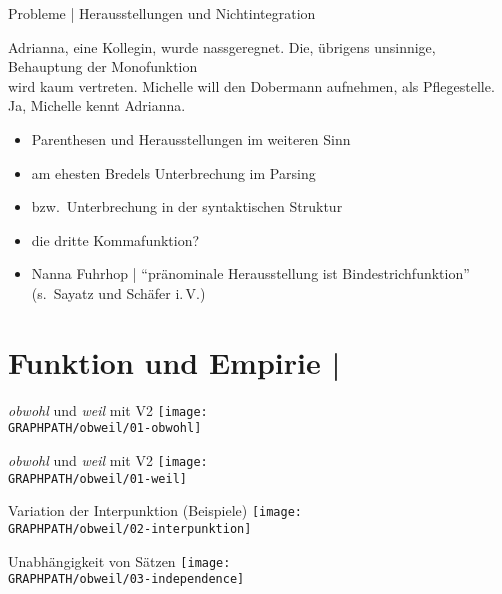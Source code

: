\begin{frame}
  {Probleme | Herausstellungen und Nichtintegration}
  \onslide<+->
  \onslide<+->
  \begin{exe}
    \ex Adrianna, \alert{eine Kollegin}, wurde nassgeregnet.
    \ex Die, \alert{übrigens unsinnige}, Behauptung der Monofunktion\\
    wird kaum vertreten.
    \ex Michelle will den Dobermann aufnehmen, \alert{als Pflegestelle}.
    \ex \alert{Ja}, Michelle kennt Adrianna.
  \end{exe}
  \onslide<+->
  \Halbzeile
  \begin{itemize}[<+->]
    \item \alert{Parenthesen} und \alert{Herausstellungen} im weiteren Sinn
    \item am ehesten Bredels Unterbrechung im Parsing
    \item bzw.\ \alert{Unterbrechung in der syntaktischen Struktur}
    \item die \alert{dritte Kommafunktion}?
      \Halbzeile
    \item Nanna Fuhrhop | "`pränominale Herausstellung ist Bindestrichfunktion"'\\
       (s.\ Sayatz und Schäfer i.\,V.)
  \end{itemize}
\end{frame}

\section[Empirie]{Funktion und Empirie | \citet{SchaeferSayatz2016}}

\begin{frame}
  {\textit{obwohl} und \textit{weil} mit V2}
  \centering 
  \texttt{[image: \\GRAPHPATH/obweil/01-obwohl]}
\end{frame}

\begin{frame}
  {\textit{obwohl} und \textit{weil} mit V2}
  \centering 
  \texttt{[image: \\GRAPHPATH/obweil/01-weil]}
\end{frame}

\begin{frame}
  {Variation der Interpunktion (Beispiele)}
  \centering 
  \texttt{[image: \\GRAPHPATH/obweil/02-interpunktion]}
\end{frame}

\begin{frame}
  {Unabhängigkeit von Sätzen}
  \centering 
  \texttt{[image: \\GRAPHPATH/obweil/03-independence]} 
\end{frame}


